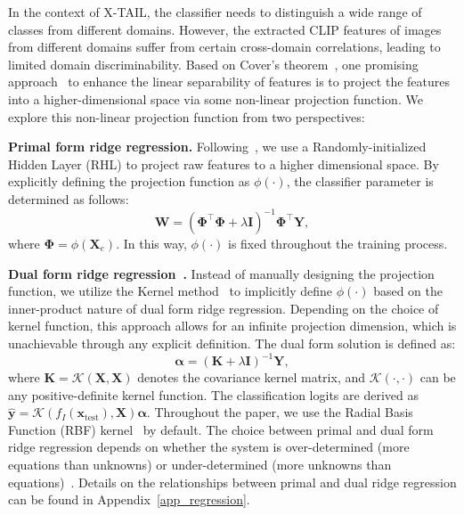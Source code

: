 \documentclass{article}
\begin{document}
In the context of X-TAIL, the classifier needs to distinguish a wide range of classes from different domains. However, the extracted CLIP features of images from different domains suffer from certain cross-domain correlations, leading to limited domain discriminability. Based on Cover's theorem~\cite{cover1965geometrical}, one promising approach~\cite{huang2006extreme, zhuang2022acil, mcdonnell2023ranpac} to enhance the linear separability of features is to project the features into a higher-dimensional space via some non-linear projection function. We explore this non-linear projection function from two perspectives:

\textbf{Primal form ridge regression.}
Following~\cite{zhuang2022acil}, we use a Randomly-initialized Hidden Layer (RHL) to project raw features to a higher dimensional space. By explicitly defining the projection function as $\phi(\cdot)$, the classifier parameter is determined as follows:
\begin{equation}
\label{primal_regression}
\mathbf{W} = \left(\mathbf{\Phi}^\top\mathbf{\Phi} + \lambda \mathbf{I}\right)^{-1}\mathbf{\Phi}^\top\mathbf{Y},
\end{equation}
where $\mathbf{\Phi}=\phi\left(\mathbf{X}_e\right)$. In this way, $\phi(\cdot)$ is fixed throughout the training process.

\textbf{Dual form ridge regression~\cite{saunders1998ridge}.}
Instead of manually designing the projection function, we utilize the Kernel method~\cite{hofmann2008kernel} to implicitly define $\phi(\cdot)$ based on the inner-product nature of dual form ridge regression. Depending on the choice of kernel function, this approach allows for an infinite projection dimension, which is unachievable through any explicit definition. The dual form solution is defined as:
\begin{equation}
\label{dual_regression}
\boldsymbol{\alpha} = \left(\mathbf{K} + \lambda \mathbf{I}\right)^{-1}\mathbf{Y},
\end{equation}
where $\mathbf{K} =\mathcal{K}\left(\mathbf{X}, \mathbf{X}\right)$ denotes the covariance kernel matrix, and $\mathcal{K}\left(\cdot, \cdot\right)$ can be any positive-definite kernel function. The classification logits are derived as $\mathbf{\hat{y}} = \mathcal{K}\left(f_I\left(\mathbf{x}_{\text{test}}\right), \mathbf{X}\right)\boldsymbol{\alpha}$. Throughout the paper, we use the Radial Basis Function (RBF) kernel~\cite{han2012parameter} by default. The choice between primal and dual form ridge regression  depends on whether the system is over-determined (more equations than unknowns) or under-determined (more unknowns than equations)~\cite{gentle2012numerical}. Details on the relationships between primal and dual ridge regression can be found in Appendix~\ref{app_regression}.
\end{document}
